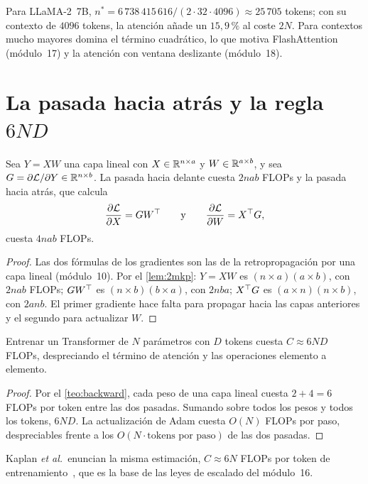 Para LLaMA-2~7B, $n^{*}=6\,738\,415\,616/(2\cdot 32\cdot 4096)\approx 25\,705$ tokens; con su contexto de $4096$ tokens, la atención añade un $15{,}9\,\%$ al coste $2N$. Para contextos mucho mayores domina el término cuadrático, lo que motiva FlashAttention (módulo~17) y la atención con ventana deslizante (módulo~18).

\section{La pasada hacia atrás y la regla \texorpdfstring{$6ND$}{6ND}}

\begin{teorema}\label{teo:backward}
Sea $Y=XW$ una capa lineal con $X\in\mathbb{R}^{n\times a}$ y $W\in\mathbb{R}^{a\times b}$, y sea $G=\partial\mathcal{L}/\partial Y\in\mathbb{R}^{n\times b}$. La pasada hacia delante cuesta $2nab$ FLOPs y la pasada hacia atrás, que calcula
\[
\frac{\partial\mathcal{L}}{\partial X}=GW^{\top}\qquad\text{y}\qquad\frac{\partial\mathcal{L}}{\partial W}=X^{\top} G,
\]
cuesta $4nab$ FLOPs.
\end{teorema}

\begin{proof}
Las dos fórmulas de los gradientes son las de la retropropagación por una capa lineal (módulo~10). Por el \cref{lem:2mkp}: $Y=XW$ es $(n\times a)(a\times b)$, con $2nab$ FLOPs; $GW^{\top}$ es $(n\times b)(b\times a)$, con $2nba$; $X^{\top} G$ es $(a\times n)(n\times b)$, con $2anb$. El primer gradiente hace falta para propagar hacia las capas anteriores y el segundo para actualizar $W$.
\end{proof}

\begin{corolario}[Regla $6ND$]\label{cor:6nd}
Entrenar un Transformer de $N$ parámetros con $D$ tokens cuesta $C\approx 6ND$ FLOPs, despreciando el término de atención y las operaciones elemento a elemento.
\end{corolario}

\begin{proof}
Por el \cref{teo:backward}, cada peso de una capa lineal cuesta $2+4=6$ FLOPs por token entre las dos pasadas. Sumando sobre todos los pesos y todos los tokens, $6ND$. La actualización de Adam cuesta $O(N)$ FLOPs por paso, despreciables frente a los $O(N\cdot\text{tokens por paso})$ de las dos pasadas.
\end{proof}

Kaplan \emph{et al.}\ enuncian la misma estimación, $C\approx 6N$ FLOPs por token de entrenamiento~\cite[§2.1]{kaplan}, que es la base de las leyes de escalado del módulo~16.

